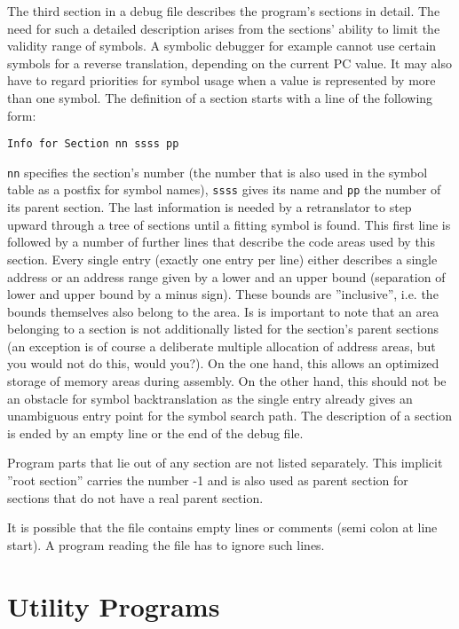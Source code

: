 \documentclass[12pt,twoside]{report}
\newcommand{\tty}[1]{{\tt #1}}
\begin{document}
The third section in a debug file describes the program's sections in
detail.  The need for such a detailed description arises from the
sections' ability to limit the validity range of symbols.  A symbolic
debugger for example cannot use certain symbols for a reverse
translation, depending on the current PC value.  It may also have to
regard priorities for symbol usage when a value is represented by
more than one symbol.  The definition of a section starts with a line
of the following form:
\begin{verbatim}
Info for Section nn ssss pp
\end{verbatim}
\tty{nn} specifies the section's number (the number that is also used in
the symbol table as a postfix for symbol names), \tty{ssss} gives its name
and \tty{pp} the number of its parent section.  The last information is
needed by a retranslator to step upward through a tree of sections
until a fitting symbol is found.  This first line is followed by a
number of further lines that describe the code areas used by this
section.  Every single entry (exactly one entry per line) either
describes a single address or an address range given by a lower and
an upper bound (separation of lower and upper bound by a minus sign).
These bounds are ''inclusive'', i.e. the bounds themselves also belong
to the area.  Is is important to note that an area belonging to a
section is not additionally listed for the section's parent sections
(an exception is of course a deliberate multiple allocation of address
areas, but you would not do this, would you?).  On the one hand, this
allows an optimized storage of memory areas during assembly. On the
other hand, this should not be an obstacle for symbol backtranslation
as the single entry already gives an unambiguous entry point for the
symbol search path.  The description of a section is ended by an
empty line or the end of the debug file.

Program parts that lie out of any section are not listed separately.
This implicit ''root section'' carries the number -1 and is also used
as parent section for sections that do not have a real parent
section.

It is possible that the file contains empty lines or comments (semi
colon at line start).  A program reading the file has to ignore such
lines.


\cleardoublepage
\chapter{Utility Programs}
\label{ChapTools}
\end{document}
